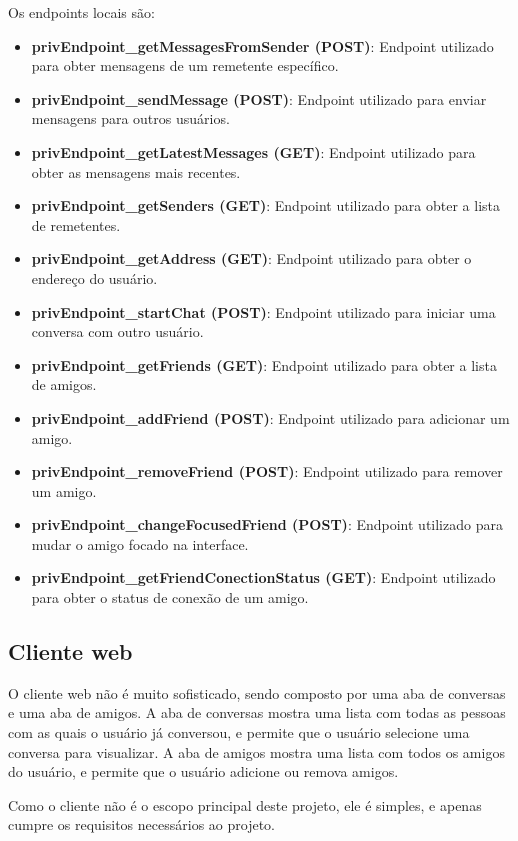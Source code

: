 Os endpoints locais são:

\begin{itemize}
\item \textbf{privEndpoint\_getMessagesFromSender (POST)}: Endpoint utilizado para obter mensagens de um remetente específico.
\item \textbf{privEndpoint\_sendMessage (POST)}: Endpoint utilizado para enviar mensagens para outros usuários.
\item \textbf{privEndpoint\_getLatestMessages (GET)}: Endpoint utilizado para obter as mensagens mais recentes.
\item \textbf{privEndpoint\_getSenders (GET)}: Endpoint utilizado para obter a lista de remetentes.
\item \textbf{privEndpoint\_getAddress (GET)}: Endpoint utilizado para obter o endereço do usuário.
\item \textbf{privEndpoint\_startChat (POST)}: Endpoint utilizado para iniciar uma conversa com outro usuário.
\item \textbf{privEndpoint\_getFriends (GET)}: Endpoint utilizado para obter a lista de amigos.
\item \textbf{privEndpoint\_addFriend (POST)}: Endpoint utilizado para adicionar um amigo.
\item \textbf{privEndpoint\_removeFriend (POST)}: Endpoint utilizado para remover um amigo.
\item \textbf{privEndpoint\_changeFocusedFriend (POST)}: Endpoint utilizado para mudar o amigo focado na interface.
\item \textbf{privEndpoint\_getFriendConectionStatus (GET)}: Endpoint utilizado para obter o status de conexão de um amigo.
\end{itemize}

\subsection{Cliente web}

O cliente web não é muito sofisticado, sendo composto por uma aba de conversas e uma aba de amigos. A aba de conversas mostra uma lista com todas as pessoas com as quais o usuário já conversou, e permite que o usuário selecione uma conversa para visualizar. A aba de amigos mostra uma lista com todos os amigos do usuário, e permite que o usuário adicione ou remova amigos.

Como o cliente não é o escopo principal deste projeto, ele é simples, e apenas cumpre os requisitos necessários ao projeto.

